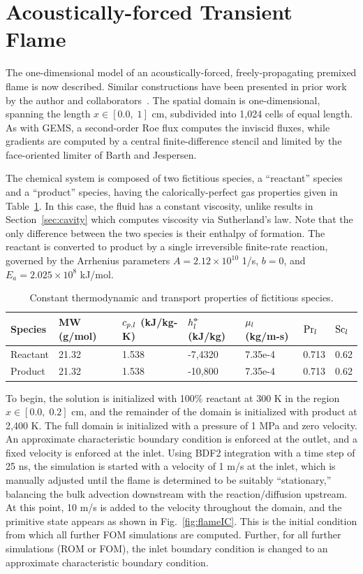 \section{Acoustically-forced Transient Flame}\label{sec:oneDFlame}

The one-dimensional model of an acoustically-forced, freely-propagating premixed flame is now described. Similar constructions have been presented in prior work by the author and collaborators~\cite{Huang2022,Wentland2019}. The spatial domain is one-dimensional, spanning the length $x \in [0.0, \; 1]$ cm, subdivided into 1,024 cells of equal length. As with GEMS, a second-order Roe flux computes the inviscid fluxes, while gradients are computed by a central finite-difference stencil and limited by the face-oriented limiter of Barth and Jespersen.

The chemical system is composed of two fictitious species, a ``reactant'' species and a ``product'' species, having the calorically-perfect gas properties given in Table~\ref{tab:oneDFlameSpecs}. In this case, the fluid has a constant viscosity, unlike results in Section~\ref{sec:cavity} which computes viscosity via Sutherland's law. Note that the only difference between the two species is their enthalpy of formation. The reactant is converted to product by a single irreversible finite-rate reaction, governed by the Arrhenius parameters $A = 2.12 \times 10^{10}$ 1/s, $b = 0$, and $E_a = 2.025 \times 10^{8}$ kJ/mol.

\begin{table}
	\centering
	\begin{tabular}{ lllllll }
	\toprule
	Species & MW (g/mol) & $c_{p,l}$ (kJ/kg-K) & $h^{\circ\kern-0.47em-}_{l}$ (kJ/kg) & $\mu_{l}$ (kg/m-s) & $\text{Pr}_{l}$ & $\text{Sc}_{l}$   \\
	\midrule
	Reactant & 21.32 & 1.538 & -7,4320 & 7.35e-4 & 0.713 & 0.62 \\
	Product & 21.32 & 1.538 & -10,800 & 7.35e-4 & 0.713 & 0.62 \\
	\bottomrule
	\end{tabular}
	\caption{\label{tab:oneDFlameSpecs}Constant thermodynamic and transport properties of fictitious species.}
\end{table}

To begin, the solution is initialized with 100\% reactant at 300 K in the region $x \in [0.0, \; 0.2]$ cm, and the remainder of the domain is initialized with product at 2,400 K. The full domain is initialized with a pressure of 1 MPa and zero velocity. An approximate characteristic boundary condition is enforced at the outlet, and a fixed velocity is enforced at the inlet. Using BDF2 integration with a time step of 25 ns, the simulation is started with a velocity of 1 m/s at the inlet, which is manually adjusted until the flame is determined to be suitably ``stationary,'' balancing the bulk advection downstream with the reaction/diffusion upstream. At this point, 10 m/s is added to the velocity throughout the domain, and the primitive state appears as shown in Fig.~\ref{fig:flameIC}. This is the initial condition from which all further FOM simulations are computed. Further, for all further simulations (ROM or FOM), the inlet boundary condition is changed to an approximate characteristic boundary condition.

